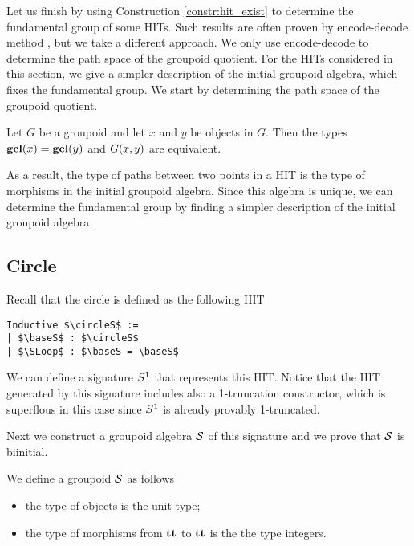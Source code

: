 Let us finish by using Construction \ref{constr:hit_exist} to determine the fundamental group of some HITs.
Such results are often proven by encode-decode method \cite{LicataS13,LicataF14}, but we take a different approach.
We only use encode-decode to determine the path space of the groupoid quotient.
For the HITs considered in this section, we give a simpler description of the initial groupoid algebra, which fixes the fundamental group.
We start by determining the path space of the groupoid quotient.

\begin{proposition}
\label{prop:groupoid_quot_encode_decode}
Let $G$ be a groupoid and let $x$ and $y$ be objects in $G$.
Then the types $\operatorname{\mathbf{gcl}}(x) = \operatorname{\mathbf{gcl}}(y)$ and $G(x, y)$ are equivalent.
\end{proposition}

As a result, the type of paths between two points in a HIT is the type of morphisms in the initial groupoid algebra.
Since this algebra is unique, we can determine the fundamental group by finding a simpler description of the initial groupoid algebra.

\subsection{Circle}
\label{sec:circle_fund_group}
Recall that the circle is defined as the following HIT

\begin{lstlisting}[mathescape=true]
Inductive $\circleS$ :=
| $\baseS$ : $\circleS$
| $\SLoop$ : $\baseS = \baseS$
\end{lstlisting}

We can define a signature $S^1$ that represents this HIT. Notice that the HIT generated by this signature includes also
a 1-truncation constructor, which is superflous in this case since $S^1$ is already provably
1-truncated.

Next we construct a groupoid algebra $\mathcal{S}$ of this signature and we prove that $\mathcal{S}$ is biinitial.

\begin{definition}
We define a groupoid $\mathcal{S}$ as follows
\begin{itemize}
	\item the type of objects is the unit type;
	\item the type of morphisms from $\operatorname{\mathbf{tt}}$ to $\operatorname{\mathbf{tt}}$ is the the type integers.
\end{itemize}
\end{definition}

